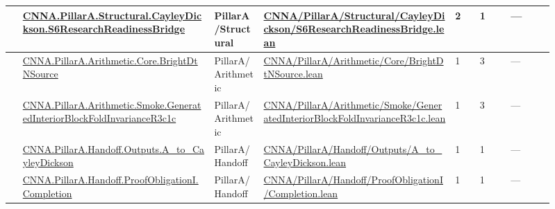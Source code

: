 \begin{longtable}{L{0.025\linewidth} L{0.315\linewidth} L{0.08\linewidth} L{0.315\linewidth} L{0.045\linewidth} L{0.055\linewidth} L{0.07\linewidth}}
\hline
{} & \href{run:repo_snapshot/CNNA/PillarA/Structural/CayleyDickson/S6ResearchReadinessBridge.lean}{CNNA.\allowbreak{}PillarA.\allowbreak{}Structural.\allowbreak{}CayleyDickson.\allowbreak{}S6ResearchReadinessBridge} & PillarA/\allowbreak{}Structural & \href{run:repo_snapshot/CNNA/PillarA/Structural/CayleyDickson/S6ResearchReadinessBridge.lean}{CNNA/\allowbreak{}PillarA/\allowbreak{}Structural/\allowbreak{}CayleyDickson/\allowbreak{}S6ResearchReadinessBridge.\allowbreak{}lean} & 2 & 1 & ---\\
\hline
{} & \href{run:repo_snapshot/CNNA/PillarA/Arithmetic/Core/BrightDtNSource.lean}{CNNA.\allowbreak{}PillarA.\allowbreak{}Arithmetic.\allowbreak{}Core.\allowbreak{}BrightDtNSource} & PillarA/\allowbreak{}Arithmetic & \href{run:repo_snapshot/CNNA/PillarA/Arithmetic/Core/BrightDtNSource.lean}{CNNA/\allowbreak{}PillarA/\allowbreak{}Arithmetic/\allowbreak{}Core/\allowbreak{}BrightDtNSource.\allowbreak{}lean} & 1 & 3 & ---\\
\hline
{} & \href{run:repo_snapshot/CNNA/PillarA/Arithmetic/Smoke/GeneratedInteriorBlockFoldInvarianceR3c1c.lean}{CNNA.\allowbreak{}PillarA.\allowbreak{}Arithmetic.\allowbreak{}Smoke.\allowbreak{}GeneratedInteriorBlockFoldInvarianceR3c1c} & PillarA/\allowbreak{}Arithmetic & \href{run:repo_snapshot/CNNA/PillarA/Arithmetic/Smoke/GeneratedInteriorBlockFoldInvarianceR3c1c.lean}{CNNA/\allowbreak{}PillarA/\allowbreak{}Arithmetic/\allowbreak{}Smoke/\allowbreak{}GeneratedInteriorBlockFoldInvarianceR3c1c.\allowbreak{}lean} & 1 & 3 & ---\\
\hline
{} & \href{run:repo_snapshot/CNNA/PillarA/Handoff/Outputs/A_to_CayleyDickson.lean}{CNNA.\allowbreak{}PillarA.\allowbreak{}Handoff.\allowbreak{}Outputs.\allowbreak{}A\_to\_CayleyDickson} & PillarA/\allowbreak{}Handoff & \href{run:repo_snapshot/CNNA/PillarA/Handoff/Outputs/A_to_CayleyDickson.lean}{CNNA/\allowbreak{}PillarA/\allowbreak{}Handoff/\allowbreak{}Outputs/\allowbreak{}A\_to\_CayleyDickson.\allowbreak{}lean} & 1 & 1 & ---\\
\hline
{} & \href{run:repo_snapshot/CNNA/PillarA/Handoff/ProofObligationI/Completion.lean}{CNNA.\allowbreak{}PillarA.\allowbreak{}Handoff.\allowbreak{}ProofObligationI.\allowbreak{}Completion} & PillarA/\allowbreak{}Handoff & \href{run:repo_snapshot/CNNA/PillarA/Handoff/ProofObligationI/Completion.lean}{CNNA/\allowbreak{}PillarA/\allowbreak{}Handoff/\allowbreak{}ProofObligationI/\allowbreak{}Completion.\allowbreak{}lean} & 1 & 1 & ---\\

\end{longtable}
